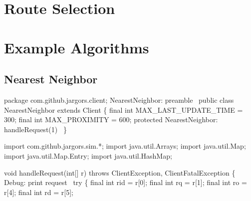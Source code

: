 \nwenddocs{}\chapter{Route Selection}
\label{search-routes}

\nwenddocs{}\chapter{Example Algorithms}
\label{search-algorithms}

\section{Nearest Neighbor}

\nwenddocs{}\endmoddef\nwstartdeflinemarkup\nwenddeflinemarkup
package com.github.jargors.client;
\LA{}NearestNeighbor: preamble~{\nwtagstyle{}}\RA{}
public class NearestNeighbor extends Client \{
  final int MAX_LAST_UPDATE_TIME = 300;
  final int MAX_PROXIMITY = 600;
  protected \LA{}NearestNeighbor: handleRequest(1)~{\nwtagstyle{}}\RA{}
\}
\nwendcode{}\nwdocspar

\nwenddocs{}\endmoddef\nwstartdeflinemarkup{}\nwenddeflinemarkup
import com.github.jargors.sim.*;
import java.util.Arrays;
import java.util.Map;
import java.util.Map.Entry;
import java.util.HashMap;
\nwendcode{}\nwdocspar

\nwenddocs{}\endmoddef\nwstartdeflinemarkup{}\nwenddeflinemarkup
void handleRequest(int[] r) throws ClientException, ClientFatalException \{
  \LA{}Debug: print request~{\nwtagstyle{}}\RA{}
  try \{
    final int rid = r[0];
    final int rq  = r[1];
    final int ro  = r[4];
    final int rd  = r[5];

